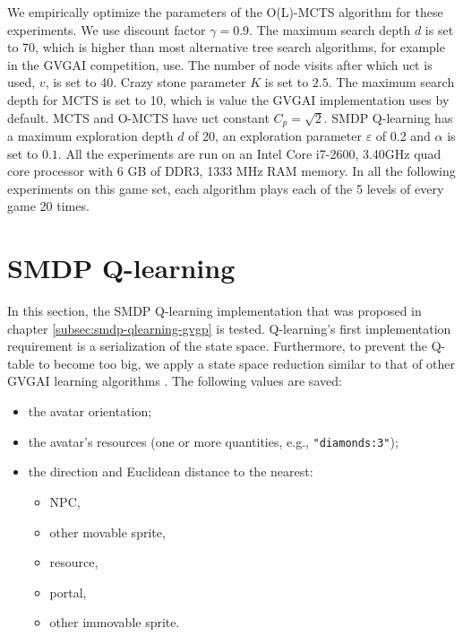 We empirically optimize the parameters of the O(L)-MCTS algorithm for these
experiments. We use discount factor $\gamma = 0.9$. The maximum search depth $d$
is set to 70, which is higher than most alternative tree search algorithms, for
example in the GVGAI competition, use. The number of node visits after which
\textsf{uct} is used, $v$, is set to 40. Crazy stone parameter $K$ is set to
$2.5$. The maximum search depth for MCTS is set to 10, which is value the GVGAI
implementation uses by default.  MCTS and O-MCTS have \textsf{uct} constant $C_p
= \sqrt{2}$. SMDP Q-learning has a maximum exploration depth $d$ of 20, an
exploration parameter $\varepsilon$ of 0.2 and $\alpha$ is set to $0.1$.  All the
experiments are run on an Intel %
Core %
i7-2600, 3.40GHz quad core processor with 6 GB of DDR3, 1333 MHz RAM memory. In
all the following experiments on this game set, each algorithm plays each of the
5 levels of every game 20 times. 

\section{SMDP Q-learning}
\label{subsec:experiments-smdp-qlearning}
In this section, the SMDP Q-learning implementation that was proposed in chapter
\ref{subsec:smdp-qlearning-gvgp} is tested. Q-learning's first implementation
requirement is a serialization of the state space.  Furthermore, to prevent the
Q-table to become too big, we apply a state space reduction similar to that of
other GVGAI learning algorithms \cite{samothrakis2015neuroevolution}.  The
following values are saved:

\begin{itemize}
	\item the avatar orientation;
	\item the avatar's resources (one or more quantities, e.g.,
		\texttt{"diamonds:3"});
	\item the direction and Euclidean distance to the nearest:
		\begin{itemize}
			\item NPC,
			\item other movable sprite,
			\item resource,
			\item portal,
			\item other immovable sprite.
		\end{itemize}
\end{itemize}

